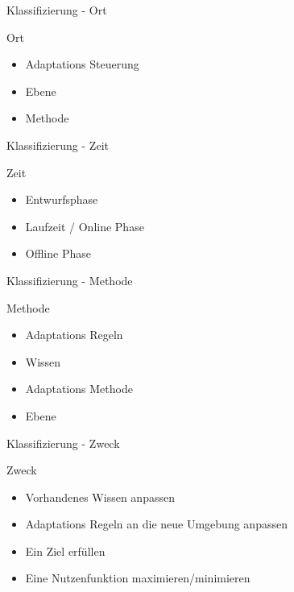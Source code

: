 \documentclass[de,16:9]{sdqbeamer}
\begin{document}
\begin{frame}{Klassifizierung - Ort}
	\begin{greenblock}{Ort}
		\begin{itemize}
			\item Adaptations Steuerung
			\item Ebene
			\item Methode
		\end{itemize}
	\end{greenblock}
\end{frame}

\begin{frame}{Klassifizierung - Zeit}
	\begin{greenblock}{Zeit}
		\begin{itemize}
			\item Entwurfsphase
			\item Laufzeit / Online Phase
			\item Offline Phase
		\end{itemize}
	\end{greenblock}
\end{frame}

\begin{frame}{Klassifizierung - Methode}
	\begin{greenblock}{Methode}
		\begin{itemize}
			\item Adaptations Regeln
			\item Wissen
			\item Adaptations Methode
			\item Ebene
		\end{itemize}
	\end{greenblock}
\end{frame}

\begin{frame}{Klassifizierung - Zweck}
	\begin{greenblock}{Zweck}
		\begin{itemize}
			\item Vorhandenes Wissen anpassen
			\item Adaptations Regeln an die neue Umgebung anpassen
			\item Ein Ziel erfüllen
			\item Eine Nutzenfunktion maximieren/minimieren
		\end{itemize}
	\end{greenblock}
\end{frame}
\end{document}
